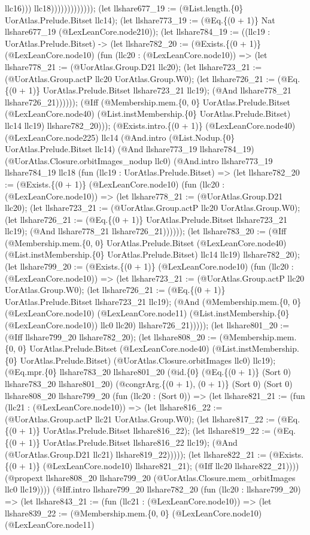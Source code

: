 \documentclass[11pt]{article}
\begin{document}
llc16))) llc18))))))))))))); (let llshare677\_19 := (@List.length.\{0\} UorAtlas.Prelude.Bitset llc14); (let llshare773\_19 := (@Eq.\{(0 + 1)\} Nat llshare677\_19 (@LexLeanCore.node210)); (let llshare784\_19 := ((llc19 : UorAtlas.Prelude.Bitset) -> (let llshare782\_20 := (@Exists.\{(0 + 1)\} (@LexLeanCore.node10) (fun (llc20 : (@LexLeanCore.node10)) => (let llshare778\_21 := (@UorAtlas.Group.D21 llc20); (let llshare723\_21 := (@UorAtlas.Group.actP llc20 UorAtlas.Group.W0); (let llshare726\_21 := (@Eq.\{(0 + 1)\} UorAtlas.Prelude.Bitset llshare723\_21 llc19); (@And llshare778\_21 llshare726\_21)))))); (@Iff (@Membership.mem.\{0, 0\} UorAtlas.Prelude.Bitset (@LexLeanCore.node40) (@List.instMembership.\{0\} UorAtlas.Prelude.Bitset) llc14 llc19) llshare782\_20))); (@Exists.intro.\{(0 + 1)\} (@LexLeanCore.node40) (@LexLeanCore.node225) llc14 (@And.intro (@List.Nodup.\{0\} UorAtlas.Prelude.Bitset llc14) (@And llshare773\_19 llshare784\_19) (@UorAtlas.Closure.orbitImages\_nodup llc0) (@And.intro llshare773\_19 llshare784\_19 llc18 (fun (llc19 : UorAtlas.Prelude.Bitset) => (let llshare782\_20 := (@Exists.\{(0 + 1)\} (@LexLeanCore.node10) (fun (llc20 : (@LexLeanCore.node10)) => (let llshare778\_21 := (@UorAtlas.Group.D21 llc20); (let llshare723\_21 := (@UorAtlas.Group.actP llc20 UorAtlas.Group.W0); (let llshare726\_21 := (@Eq.\{(0 + 1)\} UorAtlas.Prelude.Bitset llshare723\_21 llc19); (@And llshare778\_21 llshare726\_21)))))); (let llshare783\_20 := (@Iff (@Membership.mem.\{0, 0\} UorAtlas.Prelude.Bitset (@LexLeanCore.node40) (@List.instMembership.\{0\} UorAtlas.Prelude.Bitset) llc14 llc19) llshare782\_20); (let llshare799\_20 := (@Exists.\{(0 + 1)\} (@LexLeanCore.node10) (fun (llc20 : (@LexLeanCore.node10)) => (let llshare723\_21 := (@UorAtlas.Group.actP llc20 UorAtlas.Group.W0); (let llshare726\_21 := (@Eq.\{(0 + 1)\} UorAtlas.Prelude.Bitset llshare723\_21 llc19); (@And (@Membership.mem.\{0, 0\} (@LexLeanCore.node10) (@LexLeanCore.node11) (@List.instMembership.\{0\} (@LexLeanCore.node10)) llc0 llc20) llshare726\_21))))); (let llshare801\_20 := (@Iff llshare799\_20 llshare782\_20); (let llshare808\_20 := (@Membership.mem.\{0, 0\} UorAtlas.Prelude.Bitset (@LexLeanCore.node40) (@List.instMembership.\{0\} UorAtlas.Prelude.Bitset) (@UorAtlas.Closure.orbitImages llc0) llc19); (@Eq.mpr.\{0\} llshare783\_20 llshare801\_20 (@id.\{0\} (@Eq.\{(0 + 1)\} (Sort 0) llshare783\_20 llshare801\_20) (@congrArg.\{(0 + 1), (0 + 1)\} (Sort 0) (Sort 0) llshare808\_20 llshare799\_20 (fun (llc20 : (Sort 0)) => (let llshare821\_21 := (fun (llc21 : (@LexLeanCore.node10)) => (let llshare816\_22 := (@UorAtlas.Group.actP llc21 UorAtlas.Group.W0); (let llshare817\_22 := (@Eq.\{(0 + 1)\} UorAtlas.Prelude.Bitset llshare816\_22); (let llshare819\_22 := (@Eq.\{(0 + 1)\} UorAtlas.Prelude.Bitset llshare816\_22 llc19); (@And (@UorAtlas.Group.D21 llc21) llshare819\_22))))); (let llshare822\_21 := (@Exists.\{(0 + 1)\} (@LexLeanCore.node10) llshare821\_21); (@Iff llc20 llshare822\_21)))) (@propext llshare808\_20 llshare799\_20 (@UorAtlas.Closure.mem\_orbitImages llc0 llc19)))) (@Iff.intro llshare799\_20 llshare782\_20 (fun (llc20 : llshare799\_20) => (let llshare843\_21 := (fun (llc21 : (@LexLeanCore.node10)) => (let llshare839\_22 := (@Membership.mem.\{0, 0\} (@LexLeanCore.node10) (@LexLeanCore.node11) 
\end{document}

